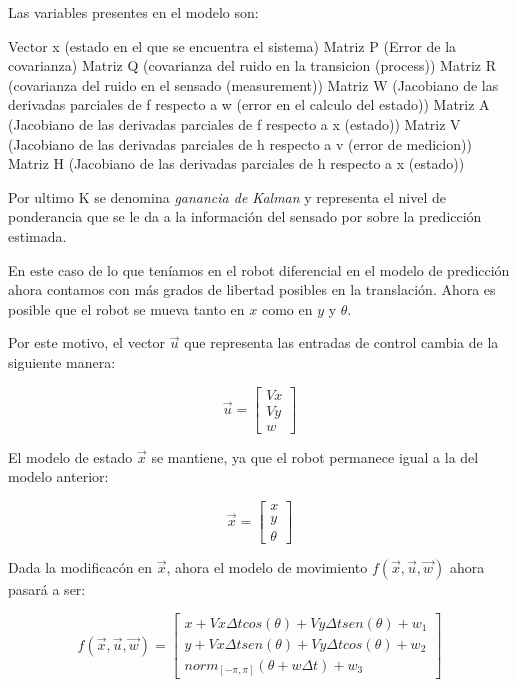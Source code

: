 
Las variables presentes en el modelo son: 

Vector x (estado en el que se encuentra el sistema)
Matriz P (Error de la covarianza)
Matriz Q (covarianza del ruido en la transicion (process))
Matriz R (covarianza del ruido en el sensado (measurement))
Matriz W (Jacobiano de las derivadas parciales de f respecto a w (error en el calculo del estado))
Matriz A (Jacobiano de las derivadas parciales de f respecto a x (estado))
Matriz V (Jacobiano de las derivadas parciales de h respecto a v (error de medicion))
Matriz H (Jacobiano de las derivadas parciales de h respecto a x (estado))
 
Por ultimo K se denomina \textit{ganancia de Kalman} y representa el nivel de ponderancia que se le da a la información del sensado por sobre la predicción estimada.

En este caso de lo que teníamos en el robot diferencial en el modelo de predicción ahora contamos con más grados de libertad posibles en la translación. Ahora es posible que el robot se mueva tanto en $x$ como en $y$ y $\theta$.

Por este motivo, el vector $\overrightarrow{u}$ que representa las entradas de control cambia de la siguiente manera:

$$\overrightarrow{u} = \begin{bmatrix}
         Vx \\
         Vy \\
         w 
        \end{bmatrix}$$


El modelo de estado $\overrightarrow{x}$ se mantiene, ya que el robot permanece igual a la del modelo anterior:

$$\overrightarrow{x} = \begin{bmatrix}
         x \\
         y \\
         \theta 
        \end{bmatrix}$$

Dada la modificacón en $\overrightarrow{x}$, ahora el modelo de movimiento $f(\overrightarrow{x},\overrightarrow{u}, \overrightarrow{w})$ ahora pasará a ser:

$$f(\overrightarrow{x},\overrightarrow{u}, \overrightarrow{w})= \begin{bmatrix}
         x + Vx \Delta t cos(\theta) + Vy \Delta t sen(\theta) + w_1 \\
         y + Vx \Delta t sen(\theta) + Vy \Delta t cos(\theta) + w_2 \\
         norm_{[-\pi,\pi]} (\theta + w \Delta t) + w_3
         \end{bmatrix}$$

